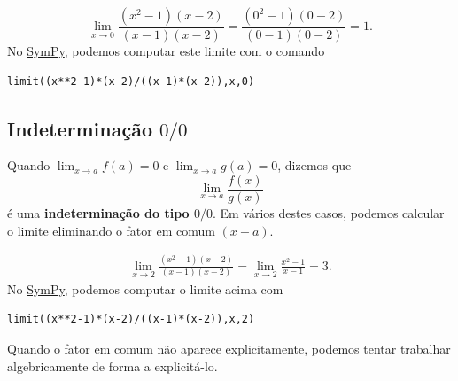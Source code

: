 \begin{ex}
  \begin{equation}
    \lim_{x\to 0} \frac{(x^2-1)(x-2)}{(x-1)(x-2)} = \frac{(0^2-1)(0-2)}{(0-1)(0-2)} = 1.
  \end{equation}
  \ifispython
  No \href{https://www.sympy.org}{SymPy}, podemos computar este limite com o comando
\begin{verbatim}
limit((x**2-1)*(x-2)/((x-1)*(x-2)),x,0)
\end{verbatim}
  \fi
\end{ex}

\subsection{Indeterminação $0/0$}

Quando $\displaystyle \lim_{x\to a} f(a)=0$ e $\displaystyle \lim_{x\to a} g(a)=0$, dizemos que
\begin{equation}
  \lim_{x\to a} \frac{f(x)}{g(x)}
\end{equation}
é uma {\bf indeterminação do tipo $0/0$}. Em vários destes casos, podemos calcular o limite eliminando o fator em comum $(x-a)$.

\begin{ex}
  \begin{align}
    \lim_{x\to 2}\frac{(x^2-1)(x-2)}{(x-1)(x-2)} = \lim_{x\to 2} \frac{x^2-1}{x-1} = 3.
  \end{align}
  \ifispython
  No \href{https://www.sympy.org}{SymPy}, podemos computar o limite acima com
\begin{verbatim}
limit((x**2-1)*(x-2)/((x-1)*(x-2)),x,2)
\end{verbatim}
  \fi
\end{ex}

Quando o fator em comum não aparece explicitamente, podemos tentar trabalhar algebricamente de forma a explicitá-lo.

